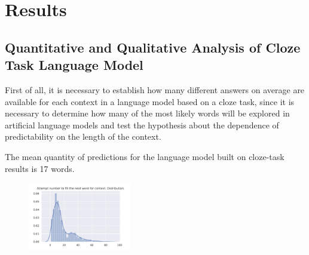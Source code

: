 \documentclass[a4paper]{article}
\begin{document}
\section{Results}

\subsection{Quantitative and Qualitative Analysis of Cloze Task Language Model}

First of all, it is necessary to establish how many different answers on average are available for each context in a language model based on a cloze task, since it is necessary to determine how many of the most likely words will be explored in artificial language models and test the hypothesis about the dependence of predictability on the length of the context.

The mean quantity of predictions for the language model built on cloze-task results is 17 words.

\begin{figure}
\centering
\includegraphics[width=0.4\textwidth]{figures/pdf/num-fill-context-dist.pdf}
\end{figure}
\end{document}
